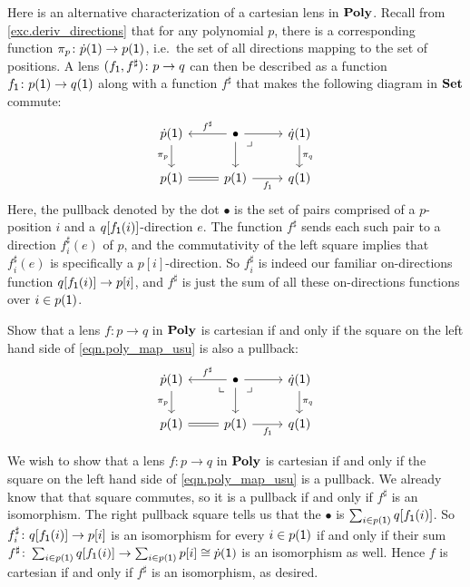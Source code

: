 \documentclass[Book-Poly]{subfiles}
\begin{document}
Here is an alternative characterization of a cartesian lens in $\mathbf{Poly}$.
Recall from \cref{exc.deriv_directions} that for any polynomial $p$, there is a corresponding function $\pi_p\colon\dot{p}(\textsf{1})\to p(\textsf{1})$, i.e.\ the set of all directions mapping to the set of positions.
A lens $(f_{\textsf{1}},f^\sharp)\colon p\to q$ can then be described as a function $f_{\textsf{1}}\colon p(\textsf{1})\to q(\textsf{1})$ along with a function $f^\sharp$ that makes the following diagram in $\mathbf{Set}$ commute:
\begin{equation}\label{eqn.poly_map_usu}
\begin{tikzcd}
	\dot{p}(\1)\ar[d, "\pi_p"']&
	\bullet\ar[l, "f^\sharp"']\ar[r]\ar[d]&
	\dot{q}(\1)\ar[d, "\pi_q"]\\
	p(\1)\ar[r, equal]&
	p(\1)\ar[r, "f_\1"']&
	q(\1)\ar[ul, phantom, very near end, "\lrcorner"]
\end{tikzcd}
\end{equation}
Here, the pullback denoted by the dot $\bullet$ is the set of pairs comprised of a $p$-position $i$ and a $q[f_{\textsf{1}}(i)]$-direction $e$.
The function $f^\sharp$ sends each such pair to a direction $f^\sharp_i(e)$ of $p$, and the commutativity of the left square implies that $f^\sharp_i(e)$ is specifically a $p[i]$-direction.
So $f^\sharp_i$ is indeed our familiar on-directions function $q[f_{\textsf{1}}(i)]\to p[i]$, and $f^\sharp$ is just the sum of all these on-directions functions over $i\in p(\textsf{1})$.

\begin{exercise} \label{exc.cart_pullbacks}
Show that a lens $f\colon p\to q$ in $\mathbf{Poly}$ is cartesian if and only if the square on the left hand side of \eqref{eqn.poly_map_usu} is also a pullback:
\[
\begin{tikzcd}
	\dot{p}(\1)\ar[d, "\pi_p"']&
	\bullet\ar[l, "f^\sharp"']\ar[r]\ar[d]&
	\dot{q}(\1)\ar[d, "\pi_q"]\\
	p(\1)\ar[r, equal]\ar[ur, phantom, very near end, "\llcorner"]&
	p(\1)\ar[r, "f_\1"']&
	q(\1)\ar[ul, phantom, very near end, "\lrcorner"]
\end{tikzcd}
\]
\begin{solution}
We wish to show that a lens $f\colon p\to q$ in $\mathbf{Poly}$ is cartesian if and only if the square on the left hand side of \eqref{eqn.poly_map_usu} is a pullback.
We already know that that square commutes, so it is a pullback if and only if $f^\sharp$ is an isomorphism.
The right pullback square tells us that the $\bullet$ is $\sum_{i\in p(\textsf{1})}q[f_{\textsf{1}}(i)]$.
So $f^\sharp_i\colon q[f_{\textsf{1}}(i)]\to p[i]$ is an isomorphism for every $i\in p(\textsf{1})$ if and only if their sum $f^\sharp\colon\sum_{i\in p(\textsf{1})}q[f_{\textsf{1}}(i)]\to\sum_{i\in p(\textsf{1})}p[i]\cong\dot{p}(\textsf{1})$ is an isomorphism as well.
Hence $f$ is cartesian if and only if $f^\sharp$ is an isomorphism, as desired.
\end{solution}
\end{exercise}
\end{document}
